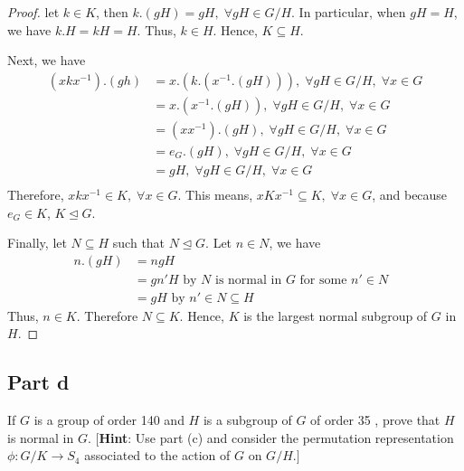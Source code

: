 \begin{answer}
    \begin{proof}
        let $k \in K$, then $k.(gH) = gH, \; \forall gH \in G/H$. In particular, when $gH = H$, we have $k.H = kH = H$. Thus, $k \in H$. Hence, $K \subseteq H$.
        
        Next, we have
        \begin{equation}
            \begin{aligned}
                (xkx^{-1}).(gh) &= x.(k.(x^{-1}.(gH))),\;\forall gH \in G/H,\;\forall x \in G\\
                &= x.(x^{-1}.(gH)),\;\forall gH \in G/H,\;\forall x \in G\\
                &= (xx^{-1}).(gH),\;\forall gH \in G/H,\;\forall x \in G\\
                &= e_G.(gH),\;\forall gH \in G/H,\;\forall x \in G\\
                &= gH,\;\forall gH \in G/H,\;\forall x \in G\\
            \end{aligned}
        \end{equation}
        Therefore, $xkx^{-1} \in K,\;\forall x \in G$. This means, $xKx^{-1} \subseteq K,\;\forall x \in G$, and because $e_G \in K$, $K \trianglelefteq G$.
        
        Finally, let $N \subseteq H$ such that $N \trianglelefteq G$. Let $n \in N$, we have
        \begin{equation}
            \begin{aligned}
                n.(gH) &= ngH\\
                &= gn'H \text{ by $N$ is normal in $G$ for some $n' \in N$ }\\
                &= gH \text{ by $n' \in N \subseteq H$}
            \end{aligned}
        \end{equation}
        Thus, $n \in K$. Therefore $N \subseteq K$. Hence, $K$ is the largest normal subgroup of $G$ in $H$.
    \end{proof}
\end{answer}

\subsection{Part d}

\begin{question}
    If $G$ is a group of order 140 and $H$ is a subgroup of $G$ of order 35 , prove that $H$ is normal in $G$. [\textbf{Hint}: Use part (c) and consider the permutation representation $\phi: G / K \rightarrow S_4$ associated to the action of $G$ on $G / H .]$
\end{question}

